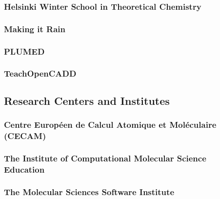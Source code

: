 \documentclass[9pt,review]{livecoms}
\begin{document}


\subsubsection{Helsinki Winter School in Theoretical Chemistry}



\subsubsection{Making it Rain}



\subsubsection{PLUMED}



\subsubsection{TeachOpenCADD}



\subsection{Research Centers and Institutes}

\subsubsection{Centre Européen de Calcul Atomique et Moléculaire (CECAM)}



\subsubsection{The Institute of Computational Molecular Science Education}


\subsubsection{The Molecular Sciences Software Institute}

\end{document}
